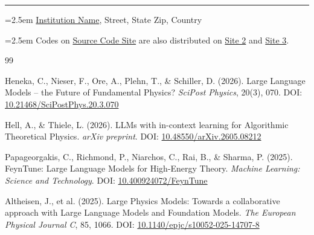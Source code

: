 \documentclass[9pt,a4paper,twocolumn]{article}
\begin{document}
\begin{strip}

\hypertarget{phdref}{} 
\scriptsize\textcolor{gray!30}{\rule{1\textwidth}{0.3pt}}\par \vspace{-1mm}
\vspace{2mm} 
\hypertarget{phdref3}{} 
\par\noindent\hangindent=2.5em 
\hyperlink{phdref2}{\notemarker{$\ast$}}\hspace{1.1em}\href{https://www.stanford.edu/}{Institution Name}, Street, State Zip, Country \vspace{1mm} 
\par\noindent\hangindent=2.5em 
\hyperlink{phdref4}{\notemarker{$\ast\ast$}}\hspace{1.1em}Codes on \href{https://github.com/hlpl}{Source Code Site} are also distributed on \href{https://github.com/hlpl}{Site 2} and \href{https://github.com/hlpl}{Site 3}.

\begin{footnotesize}
\linespread{0.8}\selectfont
\begin{thebibliography}{99}
\setlength{\itemsep}{3pt}
\setlength{\parsep}{1pt} 

Heneka, C., Nieser, F., Ore, A., Plehn, T., \& Schiller, D. (2026). Large Language Models -- the Future of Fundamental Physics? \textit{SciPost Physics}, 20(3), 070. DOI: \href{https://doi.org/10.21468/SciPostPhys.20.3.070}{10.21468/SciPostPhys.20.3.070}

Hell, A., \& Thiele, L. (2026). LLMs with in-context learning for Algorithmic Theoretical Physics. \textit{arXiv preprint}. DOI: \href{https://doi.org/10.48550/arXiv.2605.08212}{10.48550/arXiv.2605.08212}

Papageorgakis, C., Richmond, P., Niarchos, C., Rai, B., \& Sharma, P. (2025). FeynTune: Large Language Models for High-Energy Theory. \textit{Machine Learning: Science and Technology}. DOI: \href{https://doi.org}{10.400924072/FeynTune}

Altheisen, J., et al. (2025). Large Physics Models: Towards a collaborative approach with Large Language Models and Foundation Models. \textit{The European Physical Journal C}, 85, 1066. DOI: \href{https://doi.org/10.1140/epjc/s10052-025-14707-8}{10.1140/epjc/s10052-025-14707-8}


\end{thebibliography}
\end{footnotesize}
\end{strip}
\end{document}
